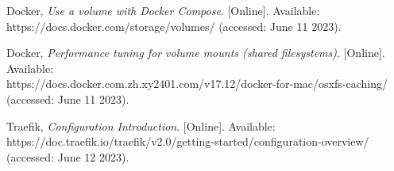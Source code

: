 \begin{referenceslist}
	\itemt Docker, \emph{Use a volume with Docker Compose}. [Online]. Available: \\
	https://docs.docker.com/storage/volumes/  (accessed: June 11 2023).
	
	\itemu Docker, \emph{Performance tuning for volume mounts (shared filesystems)}. [Online]. Available: \\
	https://docs.docker.com.zh.xy2401.com/v17.12/docker-for-mac/osxfs-caching/  (accessed: June 11 2023).
	
	\itemv Traefik, \emph{Configuration Introduction}. [Online]. Available: \\
	https://doc.traefik.io/traefik/v2.0/getting-started/configuration-overview/  (accessed: June 12 2023).
\end{referenceslist}
